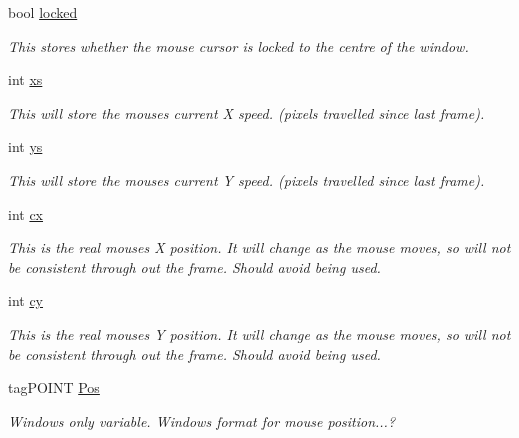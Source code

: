 \begin{DoxyCompactItemize}
bool \hyperlink{classc_mouse_a446e439868a0cbe7c7a34f05b1aac1ed}{locked}
\begin{DoxyCompactList}\small\item\em This stores whether the mouse cursor is locked to the centre of the window. \item\end{DoxyCompactList}\item 
int \hyperlink{classc_mouse_a085f43f09da455412017745e4f0b9de5}{xs}
\begin{DoxyCompactList}\small\item\em This will store the mouses current X speed. (pixels travelled since last frame). \item\end{DoxyCompactList}\item 
int \hyperlink{classc_mouse_a5747de760c63d410eac682dd9fad506f}{ys}
\begin{DoxyCompactList}\small\item\em This will store the mouses current Y speed. (pixels travelled since last frame). \item\end{DoxyCompactList}\item 
int \hyperlink{classc_mouse_a1f390f0d3f7b6b6fdc8afeba4c1e24f1}{cx}
\begin{DoxyCompactList}\small\item\em This is the real mouses X position. It will change as the mouse moves, so will not be consistent through out the frame. Should avoid being used. \item\end{DoxyCompactList}\item 
int \hyperlink{classc_mouse_aae0f866c26ab2a8ae6b2984053b71a6b}{cy}
\begin{DoxyCompactList}\small\item\em This is the real mouses Y position. It will change as the mouse moves, so will not be consistent through out the frame. Should avoid being used. \item\end{DoxyCompactList}\item 
tagPOINT \hyperlink{classc_mouse_ad6306d52aba6df1e6496c038db013442}{Pos}
\begin{DoxyCompactList}\small\item\em Windows only variable. Windows format for mouse position...? \item\end{DoxyCompactList}\end{DoxyCompactItemize}


